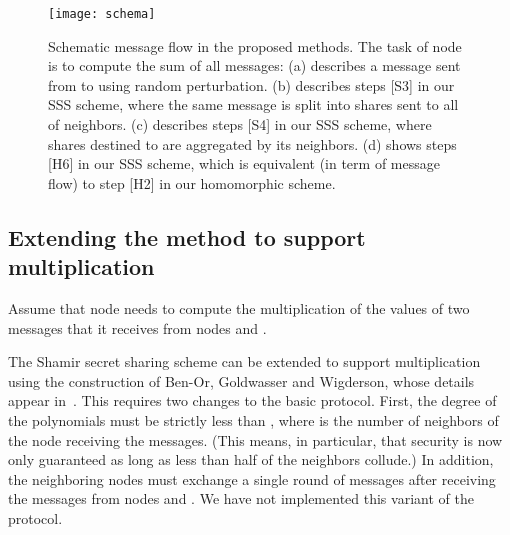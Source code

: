 \documentclass[10pt]{svjour3}
\begin{document}

\begin{figure}
\texttt{[image: schema]}\\
  \caption{Schematic message flow in the proposed methods. The task of node  is to compute the sum of all messages:  (a) describes a message sent from  to  using random perturbation.
  (b) describes steps [S3] in our SSS scheme, where the same message  is split into shares sent to all of  neighbors.
  (c) describes steps [S4] in our SSS scheme, where shares destined to  are aggregated by its neighbors. (d) shows steps [H6] in our SSS scheme,
    which is equivalent (in term of message flow) to step [H2] in our homomorphic scheme. }\label{dimes}
\end{figure}

\subsection{Extending the method to support multiplication}

Assume  that node  needs to compute the multiplication of the
values of  two messages that it receives from nodes  and .
 The Shamir secret sharing scheme
can be extended to support multiplication using the construction
of Ben-Or, Goldwasser and Wigderson, whose details appear
in~\cite{BGW}. This requires two changes to the basic protocol.
First, the degree of the polynomials must be strictly less than
, where  is the number of neighbors of the node receiving
the messages. (This means, in particular, that security is now
only guaranteed as long as less than half of the neighbors
collude.) In addition, the neighboring nodes must exchange a
single round of messages after receiving the messages from nodes
 and .
We have not implemented this variant of the protocol.
\end{document}
